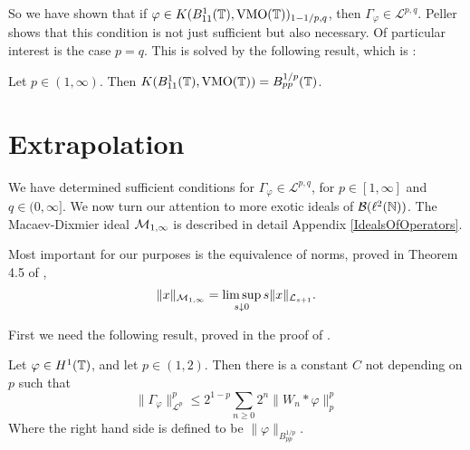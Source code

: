 


So we have shown that if $\varphi \in K(B_{11}^1(\mathbb{T}),\operatorname{VMO}(\mathbb{T}))_{1-1/p,q}$,
then $\Gamma_\varphi \in \mathcal{L}^{p,q}$. Peller \cite[Theorem 4.4, p. 256]{Peller2003} shows
that this condition is not just sufficient but also necessary. Of particular interest
is the case $p = q$. This is solved by the following result, which is \cite[Theorem 4.3, p.255]{Peller2003}:
\begin{proposition}
    Let $p \in (1,\infty)$. Then $K(B_{11}^1(\mathbb{T}),\operatorname{VMO}(\mathbb{T})) = B_{pp}^{1/p}(\mathbb{T})$. 
\end{proposition}

\section{Extrapolation}
We have determined sufficient conditions for $\Gamma_\varphi \in \mathcal{L}^{p,q}$,
for $p \in [1,\infty]$ and $q \in (0,\infty]$.
We now turn our attention to more exotic ideals of $\mathcal{B}(\ell^2(\mathbb{N}))$. The
Macaev-Dixmier ideal $\mathcal{M}_{1,\infty}$ is described in detail Appendix \ref{IdealsOfOperators}.

Most important for our purposes is the equivalence of norms, proved in Theorem 4.5 of \cite{CRSS},
\begin{equation}
\label{macaevEquiv}
    \|x\|_{\M_{1,\infty}} = \limsup_{s \downarrow 0} s\|x\|_{\mathcal{L}_{s+1}}.
\end{equation}

First we need the following result, proved in the proof of \cite[Theorem 3.1,p.250]{Peller2003}.
\begin{proposition}
\label{besovScattenEquiv}
    Let $\varphi \in H^1(\mathbb{T})$, and let $p \in (1,2)$. Then there is a constant $C$
    not depending on $p$ such that
    \begin{equation}
        \|\Gamma_{\varphi}\|_{\mathcal{L}^p}^p \leq 2^{1-p} \sum_{n\geq 0} 2^n\|W_n*\varphi\|_p^p
    \end{equation}
    Where the right hand side is defined to be $\|\varphi\|_{B_{pp}^{1/p}}$.
\end{proposition}

